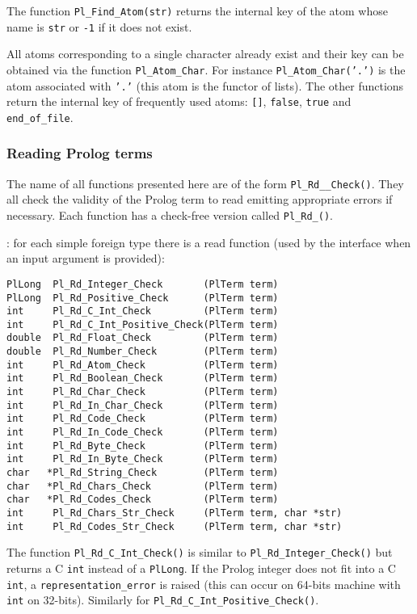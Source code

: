 The function \texttt{Pl\_Find\_Atom(str)} returns the internal key of the
atom whose name is \texttt{str} or \texttt{-1} if it does not exist.

All atoms corresponding to a single character already exist and their
key can be obtained via the function \texttt{Pl\_Atom\_Char}.  For
instance \texttt{Pl\_Atom\_Char('.')} is the atom associated with
\texttt{'.'} (this atom is the functor of lists). The other functions return
the internal key of frequently used atoms: \texttt{[]},
\texttt{false}, \texttt{true} and \texttt{end\_of\_file}.

\subsubsection{Reading Prolog terms}
\label{Reading-Prolog-terms}
The name of all functions presented here are of the form
\texttt{Pl\_Rd\_\_Check()}. They all check the validity of the
Prolog term to read emitting appropriate errors if necessary. Each function
has a check-free version called \texttt{Pl\_Rd\_()}.

: for each simple foreign type
 there is a read function (used by the
interface when an input argument is provided):

\begin{Indentation}
\begin{verbatim}
PlLong  Pl_Rd_Integer_Check       (PlTerm term)
PlLong  Pl_Rd_Positive_Check      (PlTerm term)
int     Pl_Rd_C_Int_Check         (PlTerm term)
int     Pl_Rd_C_Int_Positive_Check(PlTerm term)
double  Pl_Rd_Float_Check         (PlTerm term)
double  Pl_Rd_Number_Check        (PlTerm term)
int     Pl_Rd_Atom_Check          (PlTerm term)
int     Pl_Rd_Boolean_Check       (PlTerm term)
int     Pl_Rd_Char_Check          (PlTerm term)
int     Pl_Rd_In_Char_Check       (PlTerm term)
int     Pl_Rd_Code_Check          (PlTerm term)
int     Pl_Rd_In_Code_Check       (PlTerm term)
int     Pl_Rd_Byte_Check          (PlTerm term)
int     Pl_Rd_In_Byte_Check       (PlTerm term)
char   *Pl_Rd_String_Check        (PlTerm term)
char   *Pl_Rd_Chars_Check         (PlTerm term)
char   *Pl_Rd_Codes_Check         (PlTerm term)
int     Pl_Rd_Chars_Str_Check     (PlTerm term, char *str)
int     Pl_Rd_Codes_Str_Check     (PlTerm term, char *str)
\end{verbatim}
\end{Indentation}

The function \texttt{Pl\_Rd\_C\_Int\_Check()} is similar to
\texttt{Pl\_Rd\_Integer\_Check()} but returns a C \texttt{int} instead
of a \texttt{PlLong}. If the Prolog integer does not fit into a C
\texttt{int}, a \texttt{representation\_error} is raised (this can
occur on 64-bits machine with \texttt{int} on 32-bits). Similarly for
\texttt{Pl\_Rd\_C\_Int\_Positive\_Check()}.
  
